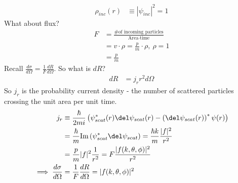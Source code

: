 \documentclass[a4paper, 11pt, normalem]{report}
\begin{document}
\begin{align}
    \rho_{inc}(r) &\equiv |\psi_{inc}|^2 = 1
\end{align}
What about flux?
\begin{align}
    F &= \frac{\text{\# of incoming particles}}{\text{Area}\cdot\text{time}} \\ 
      &= v\cdot\rho = \frac{p}{m}\cdot\rho,~ \rho = 1 \\
      &= \frac{p}{m}
\end{align}
Recall $\frac{d\sigma}{d\Omega} = \frac{1}{F}\frac{dR}{d\Omega}$. So what is $dR$?
\begin{align}
    dR &= j_r r^2 d\Omega
\end{align}
So $j_r$ is the probability current density - the number of scattered particles crossing the unit area per unit time.
\begin{align}
    j_r &\equiv \frac{\hbar}{2mi}\left(\psi^*_{scat}(r)\del\psi_{scat}(r) - \left(\del\psi_{scat}(r)\right)^*\psi(r)\right) \\
        &= \frac{\hbar}{m}\text{Im}\left(\psi^*_{scat}\del\psi_{scat}\right) = \frac{\hbar k}{m}\frac{|f|^2}{r^2} \\
        &= \frac{p}{m} |f|^2\frac{1}{r^2} = F\frac{|f(k,\theta,\phi)|^2}{r^2} \\
    \implies \frac{d\sigma}{d\Omega} &= \frac{1}{F}\frac{dR}{d\Omega} = |f(k,\theta,\phi)|^2
\end{align}
\end{document}
